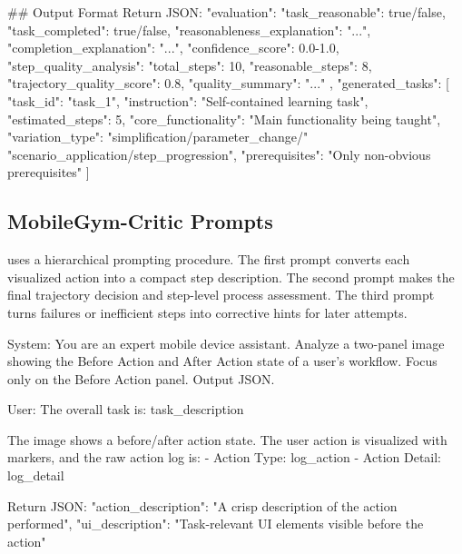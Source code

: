 \begin{promptlistingbox}
## Output Format
Return JSON:
{
  "evaluation": {
    "task_reasonable": true/false,
    "task_completed": true/false,
    "reasonableness_explanation": "...",
    "completion_explanation": "...",
    "confidence_score": 0.0-1.0,
    "step_quality_analysis": {
      "total_steps": 10,
      "reasonable_steps": 8,
      "trajectory_quality_score": 0.8,
      "quality_summary": "..."
    }
  },
  "generated_tasks": [
    {
      "task_id": "task_1",
      "instruction": "Self-contained learning task",
      "estimated_steps": 5,
      "core_functionality": "Main functionality being taught",
      "variation_type": "simplification/parameter_change/"
                        "scenario_application/step_progression",
      "prerequisites": "Only non-obvious prerequisites"
    }
  ]
}
\end{promptlistingbox}

\subsection{MobileGym-Critic Prompts}
\label{sec:critic_prompts}

\critic uses a hierarchical prompting procedure. The first prompt converts each visualized action into a compact step description. The second prompt makes the final trajectory decision and step-level process assessment. The third prompt turns failures or inefficient steps into corrective hints for later attempts.

\begin{promptlistingbox}
System:
You are an expert mobile device assistant. Analyze a two-panel image
showing the Before Action and After Action state of a user's workflow.
Focus only on the Before Action panel. Output JSON.

User:
The overall task is: {task_description}

The image shows a before/after action state. The user action is
visualized with markers, and the raw action log is:
- Action Type: {log_action}
- Action Detail: {log_detail}

Return JSON:
{
  "action_description": "A crisp description of the action performed",
  "ui_description": "Task-relevant UI elements visible before the action"
}
\end{promptlistingbox}

